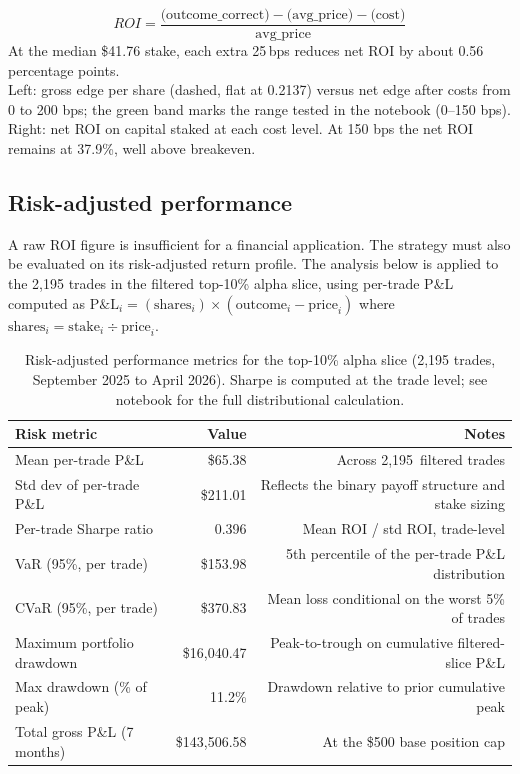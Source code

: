 \documentclass[11pt,a4paper]{article}
\newcommand{\edit}[1]{#1}
\newcommand{\FilteredRows}{\edit{2,195}}
\newcommand{\MeanTradePnl}{\edit{65.38}}
\newcommand{\StdTradePnl}{\edit{211.01}}
\newcommand{\TradeSharpe}{\edit{0.396}}
\newcommand{\TradeVaR}{\edit{153.98}}
\newcommand{\TradeCVaR}{\edit{370.83}}
\newcommand{\MaxDrawdownUSD}{\edit{16,040.47}}
\newcommand{\MaxDrawdownPct}{\edit{11.2}}
\newcommand{\GrossPnlSevenMonths}{\edit{143,506.58}}
\begin{document}
\[
ROI= \frac{\text{(outcome\_correct)} - \text{(avg\_price)} - \text{(cost)}}{ \text{avg\_price}}
\]
At the \edit{median \$41.76} stake, each extra 25\,bps reduces net ROI by about 0.56 percentage points.\\

Left: \edit{gross edge per share (dashed, flat at 0.2137)} versus net edge after costs from 0 to 200 bps;
the green band marks the range tested in the notebook (0--150 bps). Right: net ROI on capital
staked at each cost level. \edit{At 150 bps the net ROI remains at 37.9\%, well above breakeven.}

\subsection{Risk-adjusted performance}

A raw ROI figure is insufficient for a financial application. The strategy must also be evaluated on its risk-adjusted return profile. \edit{The analysis below is applied to the 2,195 trades in the filtered top-10\% alpha slice,} using per-trade P\&L computed as $\text{P\&L}_i = (\text{shares}_i) \times (\text{outcome}_i - \text{price}_i)$ where $\text{shares}_i = \text{stake}_i \div \text{price}_i$.

\begin{table}[H]
\centering
\small
\begin{tabular}{lrr}
\toprule
Risk metric & Value & Notes \\
\midrule
Mean per-trade P\&L         & \$\MeanTradePnl  & Across \FilteredRows\ filtered trades \\
Std dev of per-trade P\&L   & \$\StdTradePnl  & Reflects the binary payoff structure and stake sizing \\
Per-trade Sharpe ratio       & \TradeSharpe     & Mean ROI / std ROI, trade-level \\
VaR (95\%, per trade)       & \$\TradeVaR    & 5th percentile of the per-trade P\&L distribution \\
CVaR (95\%, per trade)      & \$\TradeCVaR    & Mean loss conditional on the worst 5\% of trades \\
Maximum portfolio drawdown   & \$\MaxDrawdownUSD  & Peak-to-trough on cumulative filtered-slice P\&L \\
Max drawdown (\% of peak)    & \MaxDrawdownPct\%    & Drawdown relative to prior cumulative peak \\
Total gross P\&L (7 months) & \$\GrossPnlSevenMonths & At the \$500 base position cap \\
\bottomrule
\end{tabular}
\caption{\edit{Risk-adjusted performance metrics for the top-10\% alpha slice (2,195 trades, September 2025 to April 2026). Sharpe is computed at the trade level; see notebook for the full distributional calculation.}}
\label{tab:risk}
\end{table}
\end{document}
